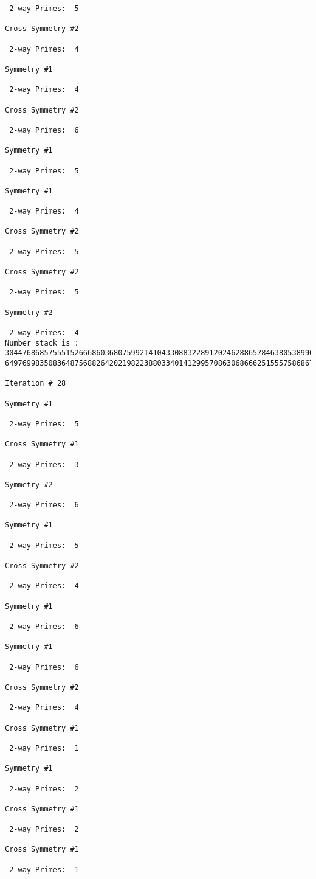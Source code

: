 \begin{verbatim}
 2-way Primes: 	5

Cross Symmetry #2

 2-way Primes: 	4

Symmetry #1

 2-way Primes: 	4

Cross Symmetry #2

 2-way Primes: 	6

Symmetry #1

 2-way Primes: 	5

Symmetry #1

 2-way Primes: 	4

Cross Symmetry #2

 2-way Primes: 	5

Cross Symmetry #2

 2-way Primes: 	5

Symmetry #2

 2-way Primes: 	4
Number stack is :
30447686857555152666860368075992141043308832289120246288657846380538996794608835958544046240163340857
64976998350836487568826420219822388033401412995708630686662515557586867440375804336104264044585953880

Iteration #	28

Symmetry #1

 2-way Primes: 	5

Cross Symmetry #1

 2-way Primes: 	3

Symmetry #2

 2-way Primes: 	6

Symmetry #1

 2-way Primes: 	5

Cross Symmetry #2

 2-way Primes: 	4

Symmetry #1

 2-way Primes: 	6

Symmetry #1

 2-way Primes: 	6

Cross Symmetry #2

 2-way Primes: 	4

Cross Symmetry #1

 2-way Primes: 	1

Symmetry #1

 2-way Primes: 	2

Cross Symmetry #1

 2-way Primes: 	2

Cross Symmetry #1

 2-way Primes: 	1


\end{verbatim}
